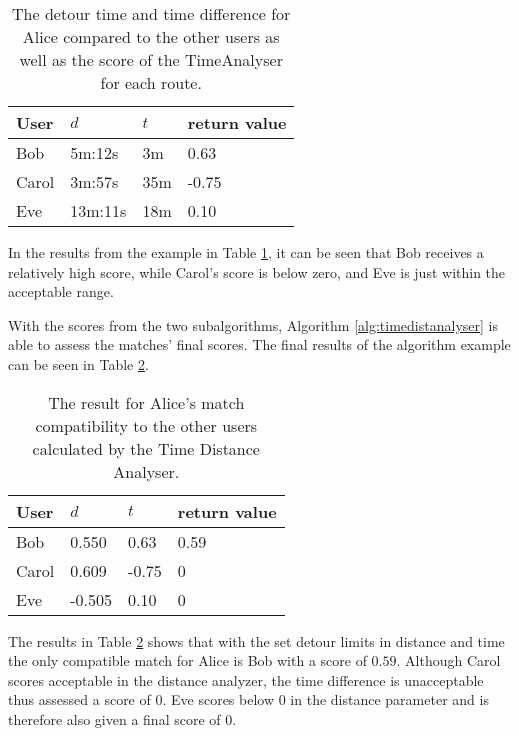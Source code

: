 \begin{table}[!ht]
\centering
\begin{tabular}{@{}llll@{}}
\toprule
\textbf{User} 	& \textbf{$d$} & \textbf{$t$} 	& \textbf{return value} \\ \midrule
Bob         	& 5m:12s       & 3m			    & 0.63				\\
Carol         	& 3m:57s       & 35m	      	& -0.75       		\\
Eve           	& 13m:11s      & 18m			& 0.10        		\\ \bottomrule
\end{tabular}
\caption{The detour time and time difference for Alice compared to the other users as well as the score of the TimeAnalyser for each route.}
\label{tbl:time}
\end{table}
 
In the results from the example in Table \ref{tbl:time}, it can be seen that Bob receives a relatively high score, while Carol's score is below zero, and Eve is just within the acceptable range. 

With the scores from the two subalgorithms, Algorithm \ref{alg:timedistanalyser} is able to assess the matches' final scores.
The final results of the algorithm example can be seen in Table \ref{tbl:timedist}.

\begin{table}[!ht]
\centering
\begin{tabular}{@{}llll@{}}
\toprule
\textbf{User} 	& \textbf{$d$} & \textbf{$t$} 	& \textbf{return value} \\ \midrule
Bob         	& 0.550 	   & 0.63		    & 0.59					\\
Carol         	& 0.609        & -0.75	      	& 0       				\\
Eve           	& -0.505       & 0.10			& 0        				\\ \bottomrule
\end{tabular}
\caption{The result for Alice's match compatibility to the other users calculated by the Time Distance Analyser.}
\label{tbl:timedist}
\end{table}

The results in Table \ref{tbl:timedist} shows that with the set detour limits in distance and time the only compatible match for Alice is Bob with a score of $0.59$. 
Although Carol scores acceptable in the distance analyzer, the time difference is unacceptable thus assessed a score of $0$.
Eve scores below 0 in the distance parameter and is therefore also given a final score of $0$.

